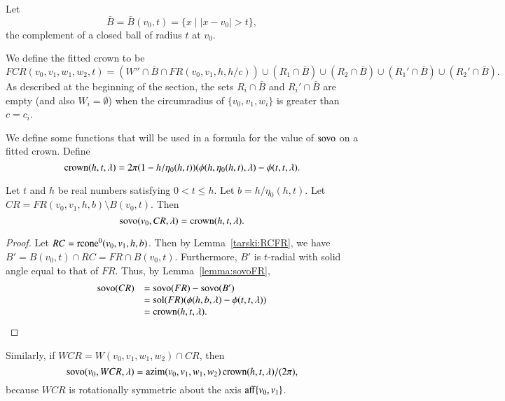 Let 
  $$\bar B = \bar B(v_0,t) = \{x \mid |x-v_0| > t\},$$
the complement of a closed ball of radius $t$ at $v_0$.

We define the fitted crown to be
$$
FCR(v_0,v_1,w_1,w_2,t) =
  (W'' \cap \bar B \cap FR(v_0,v_1,h,h/c)) \cup
  (R_1\cap \bar B) \cup (R_2 \cap \bar B) \cup
  (R_1'\cap \bar B) \cup (R_2' \cap \bar B).
$$
As described at the beginning of the section, the 
sets $R_i\cap \bar B$ and $R_i'\cap \bar B$ are empty
(and also $W_i=\emptyset$) when the circumradius of 
$\{v_0,v_1,w_i\}$ is greater than $c=c_i$.

We define some functions that will be used in a formula
for the value of ${\operatorname{sovo}}$ on a fitted crown.
Define
\begin{equation}\operatorname{crown}(h,t,\lambda) =
2\pi(1-h/\eta_0(h,t))(\phi(h,\eta_0(h,t),\lambda)-\phi(t,t,\lambda). 
\end{equation} 

\begin{lemma}\label{lemma:sovo:CR} 
Let $t$ and $h$ be real numbers satisfying 
$0 < t \le h$.
Let $b=h/\eta_0(h,t)$.
Let $CR=FR(v_0,v_1,h,b) \setminus B(v_0,t)$.
  Then
$${\operatorname{sovo}}(v_0,CR,\lambda) = \operatorname{crown}(h,t,\lambda).$$
\end{lemma}

\begin{proof}  Let $RC={\operatorname{rcone}}^0(v_0,v_1,h,b)$.
Then by Lemma~\ref{tarski:RCFR}, we have
$B' = B(v_0,t)\cap RC = FR\cap B(v_0,t)$.
Furthermore, $B'$ is $t$-radial with solid angle equal to that
of $FR$.  Thus, by Lemma~\ref{lemma:sovoFR},
$$
\begin{array}{lll}
{\operatorname{sovo}}(CR) &= {\operatorname{sovo}}(FR) - {\operatorname{sovo}}(B')\\
 &= {\operatorname{sol}}(FR) (\phi(h,b,\lambda) - \phi(t,t,\lambda))\\
 &= \operatorname{crown}(h,t,\lambda).
\end{array}
$$
\end{proof}

Similarly, if $WCR = W(v_0,v_1,w_1,w_2) \cap CR$, then
$$
{\operatorname{sovo}}(v_0,WCR,\lambda) = {\operatorname{azim}}(v_0,v_1,w_1,w_2)\operatorname{crown}(h,t,\lambda)/(2\pi),
$$
because $WCR$ 
is rotationally symmetric about the axis ${\operatorname{aff}}\{v_0,v_1\}$.



